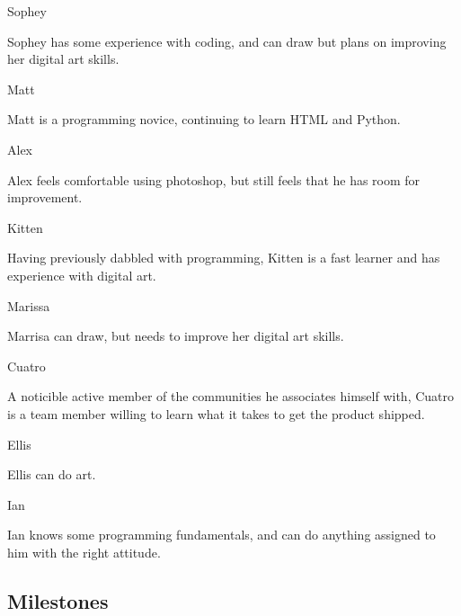 \documentclass[11pt]{article}
\begin{document}
{\large {\color{orange}Sophey}}

Sophey has some experience with coding, and can draw but plans on improving her digital art skills.

{\large {\color{orange}Matt}}

Matt is a programming novice, continuing to learn HTML and Python.

{\large {\color{orange}Alex}}

Alex feels comfortable using photoshop, but still feels that he has room for improvement.

{\large {\color{orange}Kitten}}

Having previously dabbled with programming, Kitten is a fast learner and has experience with digital art.


{\large {\color{orange}Marissa}}

Marrisa can draw, but needs to improve her digital art skills.

{\large {\color{orange}Cuatro}}

A noticible active member of the communities he associates himself with, Cuatro is a team member willing to learn what it takes to get the product shipped.

{\large {\color{orange}Ellis}}

Ellis can do art.

{\large {\color{orange}Ian}}

Ian knows some programming fundamentals, and can do anything assigned to him with the right attitude.


\subsection{{\color{blue}Milestones}}
\end{document}
